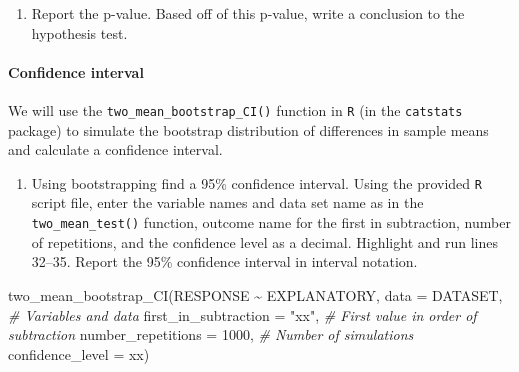 \documentclass[
]{report}
\newenvironment{Shaded}{\begin{snugshade}}{\end{snugshade}}
\newcommand{\AttributeTok}[1]{\textcolor[rgb]{0.77,0.63,0.00}{#1}}
\newcommand{\CommentTok}[1]{\textcolor[rgb]{0.56,0.35,0.01}{\textit{#1}}}
\newcommand{\DecValTok}[1]{\textcolor[rgb]{0.00,0.00,0.81}{#1}}
\newcommand{\FunctionTok}[1]{\textcolor[rgb]{0.00,0.00,0.00}{#1}}
\newcommand{\NormalTok}[1]{#1}
\newcommand{\SpecialCharTok}[1]{\textcolor[rgb]{0.00,0.00,0.00}{#1}}
\newcommand{\StringTok}[1]{\textcolor[rgb]{0.31,0.60,0.02}{#1}}
\providecommand{\tightlist}{%
  \setlength{\itemsep}{0pt}\setlength{\parskip}{0pt}}
\begin{document}
\vspace{1.5in}

\begin{enumerate}
\def\labelenumi{\arabic{enumi}.}
\setcounter{enumi}{16}
\tightlist
\item
  Report the p-value. Based off of this p-value, write a conclusion to the hypothesis test.
\end{enumerate}

\vspace{0.9in}

\newpage

\hypertarget{confidence-interval-2}{%
\paragraph*{Confidence interval}\label{confidence-interval-2}}

We will use the \texttt{two\_mean\_bootstrap\_CI()} function in \texttt{R} (in the \texttt{catstats} package) to simulate the bootstrap distribution of differences in sample means and calculate a confidence interval.

\begin{enumerate}
\def\labelenumi{\arabic{enumi}.}
\setcounter{enumi}{17}
\tightlist
\item
  Using bootstrapping find a 95\% confidence interval. Using the provided \texttt{R} script file, enter the variable names and data set name as in the \texttt{two\_mean\_test()} function, outcome name for the first in subtraction, number of repetitions, and the confidence level as a decimal. Highlight and run lines 32--35. Report the 95\% confidence interval in interval notation.
\end{enumerate}

\begin{Shaded}
\begin{Highlighting}[]
\FunctionTok{two\_mean\_bootstrap\_CI}\NormalTok{(RESPONSE }\SpecialCharTok{\textasciitilde{}}\NormalTok{ EXPLANATORY, }\AttributeTok{data =}\NormalTok{ DATASET,  }\CommentTok{\# Variables and data}
                      \AttributeTok{first\_in\_subtraction =} \StringTok{"xx"}\NormalTok{, }\CommentTok{\# First value in order of subtraction}
                      \AttributeTok{number\_repetitions =} \DecValTok{1000}\NormalTok{,  }\CommentTok{\# Number of simulations}
                      \AttributeTok{confidence\_level =}\NormalTok{ xx)}
\end{Highlighting}
\end{Shaded}
\end{document}
